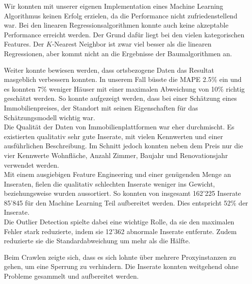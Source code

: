 Wir konnten mit unserer eigenen Implementation eines Machine Learning Algorithmus keinen Erfolg erzielen, da die Performance nicht zufriedenstellend war. Bei den linearen Regressionsalgorithmen konnte auch keine akzeptable Performance erreicht werden. Der Grund dafür liegt bei den vielen kategorischen Features. Der $K$-Nearest Neighbor ist zwar viel besser als die linearen Regressionen, aber kommt nicht an die Ergebnisse der Baumalgorithmen an.

Weiter konnte bewiesen werden, dass ortsbezogene Daten das Resultat masgeblich verbessern konnten. In unserem Fall büsste die MAPE 2.5\% ein und es konnten 7\% weniger Häuser mit einer maximalen Abweichung von 10\% richtig geschätzt werden. So konnte aufgezeigt werden, dass bei einer Schätzung eines Immobilienpreises, der Standort mit seinen Eigenschaften für das Schätzungsmodell wichtig war.\\[2ex]
%
Die Qualität der Daten von Immobilienplattformen war eher durchmischt. Es existierten qualitativ sehr gute Inserate, mit vielen Kennwerten und einer ausführlichen Beschreibung. Im Schnitt jedoch konnten neben dem Preis nur die vier Kennwerte Wohnfläche, Anzahl Zimmer, Baujahr und Renovationsjahr verwendet werden.\\
Mit einem ausgiebigen Feature Engineering und einer genügenden Menge an Inseraten, fielen die qualitativ schlechten Inserate weniger ins Gewicht, beziehungsweise wurden aussortiert.  So konnten von insgesamt 162’225 Inserate 85’845 für den Machine Learning Teil aufbereitet werden. Dies entspricht 52\% der Inserate.\\
Die Outlier Detection spielte dabei eine wichtige Rolle, da sie den maximalen Fehler stark reduzierte, indem sie 12'362 abnormale Inserate entfernte. Zudem reduzierte sie die Standardabweichung um mehr als die Hälfte.

Beim Crawlen zeigte sich, dass es sich lohnte über mehrere Proxyinstanzen zu gehen, um eine Sperrung zu verhindern. Die Inserate konnten weitgehend ohne Probleme gesammelt und aufbereitet werden.
%
